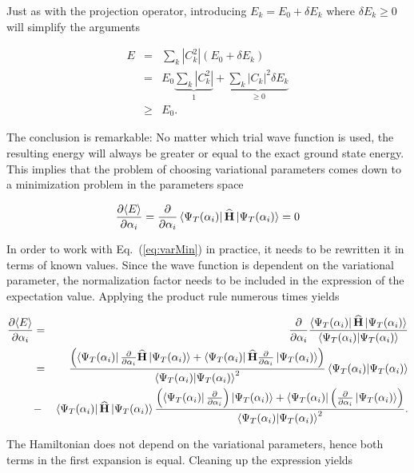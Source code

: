 Just as with the projection operator, introducing $E_k = E_0 + \delta E_k$ where $\delta E_k \ge 0$ will simplify the arguments

\begin{eqnarray*}
 E   &=& \sum_k |C_k^2| (E_0 + \delta E_k) \\
     &=& E_0 \underbrace{\sum_k |C_k^2|}_{1} + \underbrace{\sum_k |C_k|^2\delta E_k}_{\ge 0} \\
     &\ge& E_0.
\end{eqnarray*}

The conclusion is remarkable: No matter which trial wave function is used, the resulting energy will always be greater or equal to the exact ground state energy. This implies that the problem of choosing variational parameters comes down to a minimization problem in the parameters space

\begin{equation}
\label{eq:varMin}
\frac{\partial \langle E\rangle}{\partial \alpha_i} = \frac{\partial}{\partial \alpha_i}\left< \Psi_T(\alpha_i) \right|{\bf\widehat{H}}\left| \Psi_T(\alpha_i) \right> = 0
\end{equation}

In order to work with Eq.~(\ref{eq:varMin}) in practice, it needs to be rewritten it in terms of known values. Since the wave function is dependent on the variational parameter, the normalization factor needs to be included in the expression of the expectation value. Applying the product rule numerous times yields

\newcommand{\Norm}{\braket{\Psi_T(\alpha_i)}{\Psi_T(\alpha_i)}}

\begin{eqnarray*}
 \frac{\partial \langle E\rangle}{\partial \alpha_i}  &=& \frac{\partial}{\partial \alpha_i} \frac{\bra{\Psi_T(\alpha_i)}\OP{H}\ket{\Psi_T(\alpha_i)}}{\Norm} \\
 &=& \frac{\left(\bra{\Psi_T(\alpha_i)}\frac{\partial}{\partial \alpha_i}\OP{H}\ket{\Psi_T(\alpha_i)} + \bra{\Psi_T(\alpha_i)}\OP{H}\frac{\partial}{\partial \alpha_i}\ket{\Psi_T(\alpha_i)}\right)}{\Norm^2}\Norm \\
 &-& \bra{\Psi_T(\alpha_i)}\OP{H}\ket{\Psi_T(\alpha_i)}\frac{\left(\bra{\Psi_T(\alpha_i)}\frac{\partial}{\partial \alpha_i}\right)\ket{\Psi_T(\alpha_i)} + \bra{\Psi_T(\alpha_i)}\left(\frac{\partial}{\partial \alpha_i}\ket{\Psi_T(\alpha_i)}\right)}{\Norm^2}.\\
\end{eqnarray*}

The Hamiltonian does not depend on the variational parameters, hence both terms in the first expansion is equal. Cleaning up the expression yields

